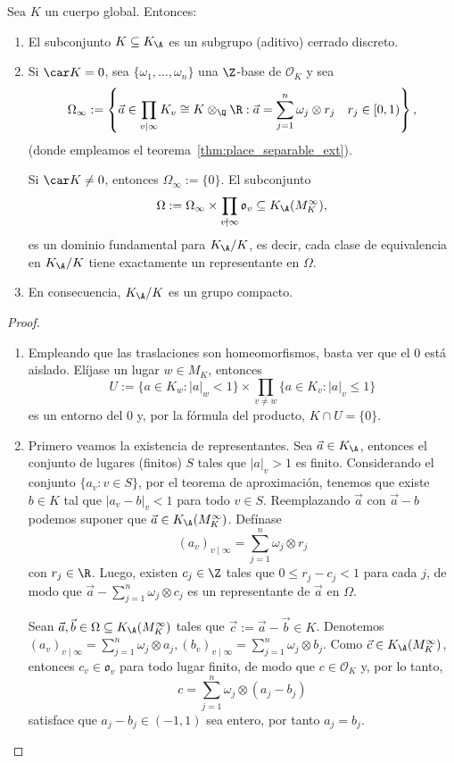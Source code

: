 \documentclass[teoria-numeros.tex]{subfiles}
\begin{document}
\begin{thm}
	Sea $K$ un cuerpo global. Entonces:
	\begin{enumerate}
		\item El subconjunto $K \subseteq K_\A$ es un subgrupo (aditivo) cerrado discreto.
		\item Si $\car K = 0$, sea $\{ \omega_1, \dots, \omega_n \}$ una $\Z$-base de $\mathcal{O}_K$ y sea
			$$ \Omega_\infty := \left\{ \vec a \in \prod_{v\mid \infty} K_v \cong K \otimes_\Q \R :
			\vec a = \sum_{j=1}^{n} \omega_j \otimes r_j \quad r_j \in [0, 1) \right\}, $$
			(donde empleamos el teorema~\ref{thm:place_separable_ext}).

			Si $\car K \ne 0$, entonces $\Omega_\infty := \{ 0 \}$.
			El subconjunto
			$$ \Omega := \Omega_\infty \times \prod_{v \nmid \infty} \mathfrak{o}_v \subseteq K_\A(M_K^\infty), $$
			es un dominio fundamental para $K_\A/K$, es decir, cada clase de equivalencia en $K_\A/K$ tiene exactamente un representante en $\Omega$.
		\item En consecuencia, $K_\A/K$ es un grupo compacto.
	\end{enumerate}
\end{thm}
\begin{proof}
	\begin{enumerate}
		\item Empleando que las traslaciones son homeomorfismos, basta ver que el 0 está aislado.
			Elíjase un lugar $w \in M_K$, entonces 
			$$ U := \{ a \in K_w : |a|_w < 1 \} \times \prod_{v \ne w} \{ a \in K_v : |a|_v \le 1 \} $$
			es un entorno del 0 y, por la fórmula del producto, $K \cap U = \{ 0 \}$.
		\item Primero veamos la existencia de representantes.
			Sea $\vec a \in K_\A$, entonces el conjunto de lugares (finitos) $S$ tales que $|a|_v > 1$ es finito.
			Considerando el conjunto $\{ a_v : v \in S \}$, por el teorema de aproximación, tenemos que existe $b \in K$
			tal que $|a_v - b|_v < 1$ para todo $v \in S$.
			Reemplazando $\vec a$ con $\vec a - b$ podemos suponer que $\vec a \in K_\A(M_K^\infty)$.
			Defínase
			$$ (a_v)_{v\mid\infty} = \sum_{j=1}^{n} \omega_j \otimes r_j $$
			con $r_j \in \R$.
			Luego, existen $c_j \in \Z$ tales que $0 \le r_j - c_j < 1$ para cada $j$, de modo que $\vec a - \sum_{j=1}^{n} \omega_j \otimes c_j$
			es un representante de $\vec a$ en $\Omega$.

			Sean $\vec a, \vec b \in \Omega \subseteq K_\A(M_K^\infty)$ tales que $\vec c := \vec a - \vec b \in K$.
			Denotemos $(a_v)_{v\mid\infty} = \sum_{j=1}^{n} \omega_j \otimes a_j, (b_v)_{v\mid\infty} = \sum_{j=1}^{n} \omega_j \otimes b_j$.
			Como $\vec c \in K_\A(M_K^\infty)$, entonces $c_v \in \mathfrak{o}_v$ para todo lugar finito, de modo que $c \in \mathcal{O}_K$ y,
			por lo tanto,
			$$ c = \sum_{j=1}^{n} \omega_j \otimes (a_j - b_j) $$
			satisface que $a_j - b_j \in (-1, 1)$ sea entero, por tanto $a_j = b_j$. \qedhere
	\end{enumerate}
\end{proof}
\end{document}
